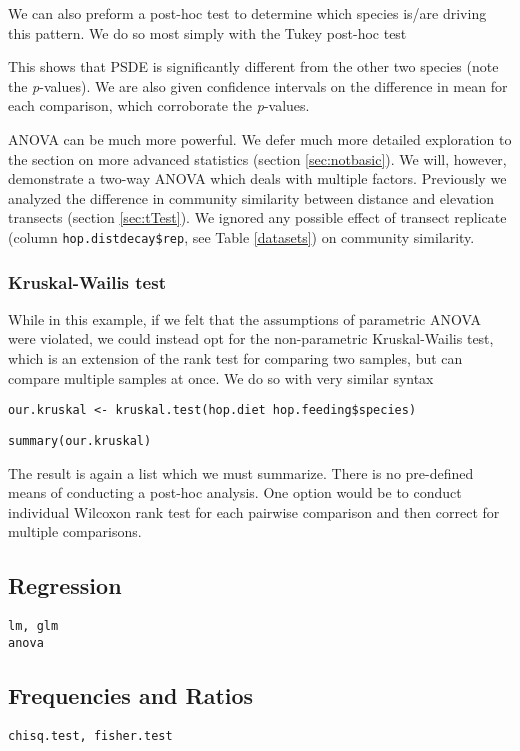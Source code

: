 \documentclass[12pt]{article}
\newcommand{\R}[1] {
	\item \texttt{#1}
}
\newenvironment{verbatim}{ 
	\indent
	\begin{list}{}{\setlength{\itemsep}{-1.5mm}}
}{
	\end{list}
}
\begin{document}
We can also preform a post-hoc test to determine which species is/are driving this pattern.  We do so most simply with the Tukey post-hoc test
\begin{quote}
	
\end{quote}
This shows that PSDE is significantly different from the other two species (note the \emph{p}-values).  We are also given confidence intervals on the difference in mean for each comparison, which corroborate the \emph{p}-values.

ANOVA can be much more powerful.  We defer much more detailed exploration to the section on more advanced statistics (section \ref{sec:notbasic}).  We will, however, demonstrate a two-way ANOVA which deals with multiple factors.  Previously we analyzed the difference in community similarity between distance and elevation transects (section \ref{sec:tTest}).  We ignored any possible effect of transect replicate (column \verb+hop.distdecay$rep+, see Table \ref{datasets}) on community similarity.

\subsubsection{Kruskal-Wailis test}
While in this example, if we felt that the assumptions of parametric ANOVA were violated, we could instead opt for the non-parametric Kruskal-Wailis test, which is an extension of the rank test for comparing two samples, but can compare multiple samples at once.  We do so with very similar syntax
\begin{verbatim}
	\R{our.kruskal <- kruskal.test(hop.diet~hop.feeding\$species)}
	\R{summary(our.kruskal)}
\end{verbatim}
The result is again a list which we must summarize.  There is no pre-defined means of conducting a post-hoc analysis.  One option would be to conduct individual Wilcoxon rank test for each pairwise comparison and then correct for multiple comparisons.



\subsection{Regression}
\verb+lm, glm+
\\
\verb+anova+

\subsection{Frequencies and Ratios}
\verb+chisq.test, fisher.test+
\end{document}
